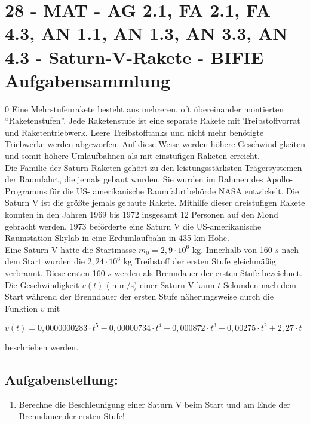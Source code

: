 \section{28 - MAT - AG 2.1, FA 2.1, FA 4.3, AN 1.1, AN 1.3, AN 3.3, AN 4.3 - Saturn-V-Rakete - BIFIE Aufgabensammlung}

\begin{langesbeispiel} \item[0] %
				Eine Mehrstufenrakete besteht aus mehreren, oft übereinander montierten "`Raketenstufen"'. Jede Raketenstufe ist eine separate Rakete mit Treibstoffvorrat und Raketentriebwerk. Leere Treibstofftanks und nicht mehr benötigte Triebwerke werden abgeworfen. Auf diese Weise werden höhere Geschwindigkeiten und somit höhere Umlaufbahnen als mit einstufigen Raketen erreicht.\\
Die Familie der Saturn-Raketen gehört zu den leistungsstärksten Trägersystemen der Raumfahrt, die jemals gebaut wurden. Sie wurden im Rahmen des Apollo-Programms für die US-
amerikanische Raumfahrtbehörde NASA entwickelt. Die Saturn V ist die größte jemals gebaute
Rakete. Mithilfe dieser dreistufigen Rakete konnten in den Jahren 1969 bis 1972 insgesamt
12 Personen auf den Mond gebracht werden. 1973 beförderte eine Saturn V die US-amerikanische Raumstation Skylab in eine Erdumlaufbahn in 435 km Höhe.\\
Eine Saturn V hatte die Startmasse $m_0=2,9\cdot 10^6$ kg. Innerhalb von 160 $s$ nach dem Start
wurden die $2,24\cdot 10^6$ kg Treibstoff der ersten Stufe gleichmäßig verbrannt. Diese ersten 160 $s$ werden als Brenndauer der ersten Stufe bezeichnet. Die Geschwindigkeit $v(t)$ (in m/s) einer Saturn V kann $t$ Sekunden nach dem Start während der Brenndauer der ersten Stufe näherungsweise durch die Funktion $v$ mit

\begin{center}
	$v(t)=0,0000000283\cdot t^5-0,00000734\cdot t^4+0,000872\cdot t^3-0,00275\cdot t^2+2,27\cdot t$\end{center}
	
	beschrieben werden.


\subsection{Aufgabenstellung:}
\begin{enumerate}
	\item Berechne die Beschleunigung einer Saturn V beim Start und am Ende der Brenndauer der ersten Stufe!
	

\end{enumerate}
\end{langesbeispiel}
